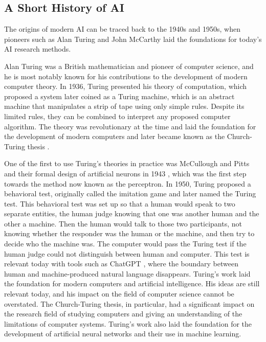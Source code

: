 \subsection{A Short History of AI}
The origins of modern AI can be traced back to the 1940s and 1950s, when pioneers such as Alan Turing and John McCarthy laid the foundations for today's AI research methods. 

Alan Turing was a British mathematician and pioneer of computer science, and he is most notably known for his contributions to the development of modern computer theory. In 1936, Turing presented his theory of computation, which proposed a system later coined as a Turing machine, which is an abstract machine that manipulates a strip of tape using only simple rules. Despite its limited rules, they can be combined to interpret any proposed computer algorithm. The theory was revolutionary at the time and laid the foundation for the development of modern computers and later became known as the Church-Turing thesis \cite{turingSystemsLogicBased1938, churchUnsolvableProblemElementary1936}. 

One of the first to use Turing's theories in practice was McCullough and Pitts and their formal design of artificial neurons in 1943 \cite{mccullochLogicalCalculusIdeas1943, piccininiFirstComputationalTheory2020}, which was the first step towards the method now known as the perceptron. In 1950, Turing proposed a behavioral test, originally called the imitation game and later named the Turing test. This behavioral test was set up so that a human would speak to two separate entities, the human judge knowing that one was another human and the other a machine. Then the human would talk to those two participants, not knowing whether the responder was the human or the machine, and then try to decide who the machine was. The computer would pass the Turing test if the human judge could not distinguish between human and computer. This test is relevant today with tools such as ChatGPT \cite{ChatGPT}, where the boundary between human and machine-produced natural language disappears. Turing's work laid the foundation for modern computers and artificial intelligence. His ideas are still relevant today, and his impact on the field of computer science cannot be overstated. The Church-Turing thesis, in particular, had a significant impact on the research field of studying computers and giving an understanding of the limitations of computer systems. Turing's work also laid the foundation for the development of artificial neural networks and their use in machine learning.


